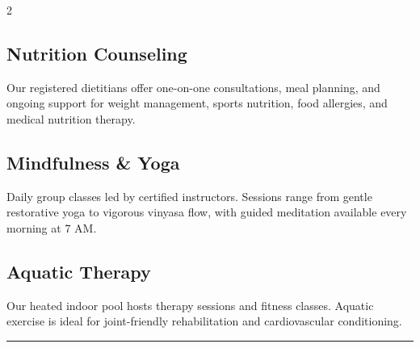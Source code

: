 \documentclass[
    language=english,
    doctype=brochure,
    institution=none,
]{../../omnilatex}
\begin{document}
\begin{multicols}{2}
\columnbreak

\subsection*{Nutrition Counseling}
Our registered dietitians offer one-on-one consultations, meal planning, and
ongoing support for weight management, sports nutrition, food allergies, and
medical nutrition therapy.

\subsection*{Mindfulness \& Yoga}
Daily group classes led by certified instructors. Sessions range from gentle
restorative yoga to vigorous vinyasa flow, with guided meditation available
every morning at 7 AM.

\subsection*{Aquatic Therapy}
Our heated indoor pool hosts therapy sessions and fitness classes. Aquatic
exercise is ideal for joint-friendly rehabilitation and cardiovascular conditioning.

\end{multicols}

\vspace{0.5em}
\noindent\rule{\textwidth}{0.4pt}
\vspace{0.5em}
\end{document}
